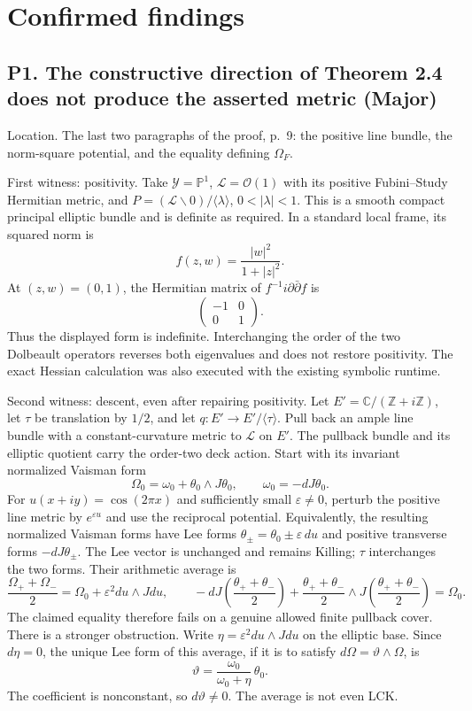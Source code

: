 \documentclass[10pt]{article}
\begin{document}
\section*{Confirmed findings}
\subsection*{P1. The constructive direction of Theorem 2.4 does not produce the asserted metric (Major)}
Location. The last two paragraphs of the proof, p. 9: the positive line bundle, the norm-square potential, and the equality defining \(\Omega_F\).\par
First witness: positivity. Take \(\mathcal Y=\mathbb P^1\), \(\mathcal L=\mathcal O(1)\) with its positive Fubini–Study Hermitian metric, and \(P=(\mathcal L\smallsetminus0)/\langle\lambda\rangle\), \(0<|\lambda|<1\). This is a smooth compact principal elliptic bundle and is definite as required. In a standard local frame, its squared norm is \[f(z,w)=\frac{|w|^2}{1+|z|^2}.\] At \((z,w)=(0,1)\), the Hermitian matrix of \(f^{-1}i\partial\bar\partial f\) is \[\begin{pmatrix}-1&0\\0&1\end{pmatrix}.\] Thus the displayed form is indefinite. Interchanging the order of the two Dolbeault operators reverses both eigenvalues and does not restore positivity. The exact Hessian calculation was also executed with the existing symbolic runtime.\par
Second witness: descent, even after repairing positivity. Let \(E'=\mathbb C/(\mathbb Z+i\mathbb Z)\), let \(\tau\) be translation by \(1/2\), and let \(q:E'\to E'/\langle\tau\rangle\). Pull back an ample line bundle with a constant-curvature metric to \(\mathcal L\) on \(E'\). The pullback bundle and its elliptic quotient carry the order-two deck action. Start with its invariant normalized Vaisman form \[\Omega_0=\omega_0+\theta_0\wedge J\theta_0,\qquad
 \omega_0=-dJ\theta_0.\] For \(u(x+iy)=\cos(2\pi x)\) and sufficiently small \(\varepsilon\ne0\), perturb the positive line metric by \(e^{\varepsilon u}\) and use the reciprocal potential. Equivalently, the resulting normalized Vaisman forms have Lee forms \(\theta_\pm=\theta_0\pm\varepsilon\,du\) and positive transverse forms \(-dJ\theta_\pm\). The Lee vector is unchanged and remains Killing; \(\tau\) interchanges the two forms. Their arithmetic average is \[\frac{\Omega_++\Omega_-}{2}
   =\Omega_0+\varepsilon^2du\wedge Jdu ,
 \qquad
 -dJ\!\left(\frac{\theta_++\theta_-}{2}\right)
 +\frac{\theta_++\theta_-}{2}
       \wedge J\!\left(\frac{\theta_++\theta_-}{2}\right)
   =\Omega_0.\] The claimed equality therefore fails on a genuine allowed finite pullback cover. There is a stronger obstruction. Write \(\eta=\varepsilon^2du\wedge Jdu\) on the elliptic base. Since \(d\eta=0\), the unique Lee form of this average, if it is to satisfy \(d\Omega=\vartheta\wedge\Omega\), is \[\vartheta=\frac{\omega_0}{\omega_0+\eta}\,\theta_0.\] The coefficient is nonconstant, so \(d\vartheta\ne0\). The average is not even LCK.\par
\end{document}
